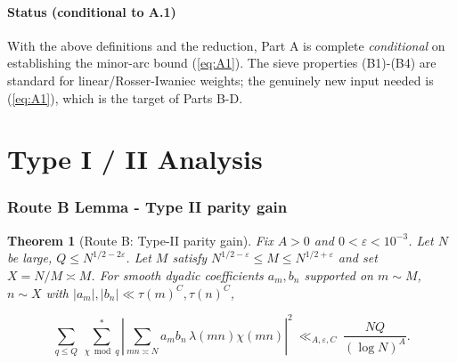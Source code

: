 \documentclass[11pt]{article}
\def\eqref#1{(\ref{#1})}%
\newtheorem{theorem}[lemma]{Theorem}
\theoremstyle{definition}
\theoremstyle{remark}
\numberwithin{equation}{part}
\begin{document}
\subsection{Status (conditional to A.1)}
With the above definitions and the reduction, Part A is complete \emph{conditional} on establishing the minor-arc bound \eqref{eq:A1}. The sieve properties (B1)-(B4) are standard for linear/Rosser-Iwaniec weights; the genuinely new input needed is \eqref{eq:A1}, which is the target of Parts B-D.

\part{Type I / II Analysis}

\section{Route B Lemma - Type II parity gain}

\begin{theorem}[Route B: Type-II parity gain]
	Fix $A>0$ and $0<\varepsilon<10^{-3}$. Let $N$ be large, $Q\le N^{1/2-2\varepsilon}$. Let $M$ satisfy $N^{1/2-\varepsilon}\le M\le N^{1/2+\varepsilon}$ and set $X=N/M\asymp M$. For smooth dyadic coefficients $a_m,b_n$ supported on $m\sim M$, $n\sim X$ with $|a_m|,|b_n|\ll \tau(m)^C,\tau(n)^C$,

	$$
		\sum_{q\le Q}\ \sum_{\chi\bmod q}^{\!*}
		\left|\sum_{mn\asymp N} a_m b_n\,\lambda(mn)\chi(mn)\right|^2
		\ \ll_{A,\varepsilon,C}\ \frac{NQ}{(\log N)^{A}}.
	$$
\end{theorem}
\end{document}
